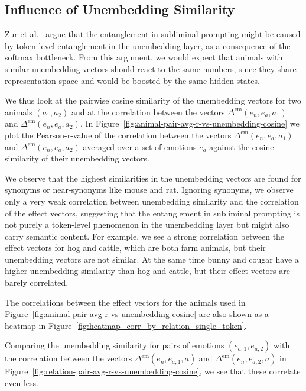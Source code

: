 \documentclass[10pt,twocolumn]{article}
\begin{document}
\begin{qualitymark}[cyan]
    \subsection{Influence of Unembedding Similarity}
    Zur et al.~\cite{zurItsOwlNumbers2025} argue that the entanglement in subliminal prompting might be caused by token-level entanglement in the unembedding layer, as a consequence of the softmax bottleneck.
    From this argument, we would expect that animals with similar unembedding vectors should react to the same numbers, since they share representation space and would be boosted by the same hidden states.
    
    We thus look at the pairwise cosine similarity of the unembedding vectors for two animals $(a_1, a_2)$ and at the correlation between the vectors $\Delta^\text{em}(e_n, e_a, a_1)$ and $\Delta^\text{em}(e_n, e_a, a_2)$.
    In Figure~\ref{fig:animal-pair-avg-r-vs-unembedding-cosine} we plot the Pearson-r-value of the correlation between the vectors $\Delta^\text{em}(e_n, e_a, a_1)$ and $\Delta^\text{em}(e_n, e_a, a_2)$ averaged over a set of emotions $e_a$ against the cosine similarity of their unembedding vectors.

    We observe that the highest similarities in the unembedding vectors are found for synonyms or near-synonyms like mouse and rat. 
    Ignoring synonyms, we observe only a very weak correlation between unembedding similarity and the correlation of the effect vectors, suggesting that the entanglement in subliminal prompting is not purely a token-level phenomenon in the unembedding layer but might also carry semantic content.
    For example, we see a strong correlation between the effect vectors for hog and cattle, which are both farm animals, but their unembedding vectors are not similar.
    At the same time bunny and cougar have a higher unembedding similarity than hog and cattle, but their effect vectors are barely correlated.

    The correlations between the effect vectors for the animals used in Figure~\ref{fig:animal-pair-avg-r-vs-unembedding-cosine} are also shown as a heatmap in Figure~\ref{fig:heatmap_corr_by_relation_single_token}.

    Comparing the unembedding similarity for pairs of emotions $(e_{a,1}, e_{a,2})$ with the correlation between the vectors $\Delta^\text{em}(e_n, e_{a,1}, a)$ and $\Delta^\text{em}(e_n, e_{a,2}, a)$ in Figure~\ref{fig:relation-pair-avg-r-vs-unembedding-cosine}, we see that these correlate even less.


\end{qualitymark}
\end{document}
